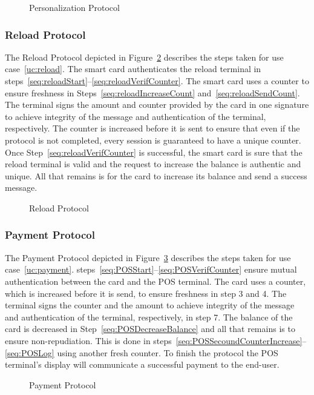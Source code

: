  \begin{figure}[h!]
     \centering
     
     \caption{Personalization Protocol}
     \label{fig:PersonProtocol}
 \end{figure}

\subsubsection{Reload Protocol}
The Reload Protocol depicted in Figure~\ref{fig:ReloadProtocol} describes the steps taken for use case~\ref{uc:reload}.
The smart card authenticates the reload terminal in steps~\ref{seq:reloadStart}--\ref{seq:reloadVerifCounter}.
The smart card uses a counter to ensure freshness in Steps~\ref{seq:reloadIncreaseCount} and~\ref{seq:reloadSendCount}.
The terminal signs the amount and counter provided by the card in one signature to achieve integrity of the message and authentication of the terminal, respectively.
The counter is increased before it is sent to ensure that even if the protocol is not completed, every session is guaranteed to have a unique counter.
Once Step~\ref{seq:reloadVerifCounter} is successful, the smart card is sure that the reload terminal is valid and the request to increase the balance is authentic and unique.
All that remains is for the card to increase its balance and send a success message.
 \begin{figure}[h!]
     \centering
     
     \caption{Reload Protocol}
     \label{fig:ReloadProtocol}
 \end{figure}

\subsubsection{Payment Protocol}
The Payment Protocol depicted in Figure~\ref{fig:POSProtocol} describes the steps taken for use case~\ref{uc:payment}.
steps~\ref{seq:POSStart}--\ref{seq:POSVerifCounter} ensure mutual authentication between the card and the POS terminal.
The card uses a counter, which is increased before it is send, to ensure freshness in step 3 and 4.
The terminal signs the counter and the amount to achieve integrity of the message and authentication of the terminal, respectively, in step 7.
The balance of the card is decreased in Step~\ref{seq:POSDecreaseBalance} and all that remains is to ensure non-repudiation.
This is done in steps~\ref{seq:POSSecoundCounterIncrease}--\ref{seq:POSLog} using another fresh counter.
To finish the protocol the POS terminal's display will communicate a successful payment to the end-user.
\begin{figure}[h!]
    \centering
    
    \caption{Payment Protocol}
    \label{fig:POSProtocol}
\end{figure}


